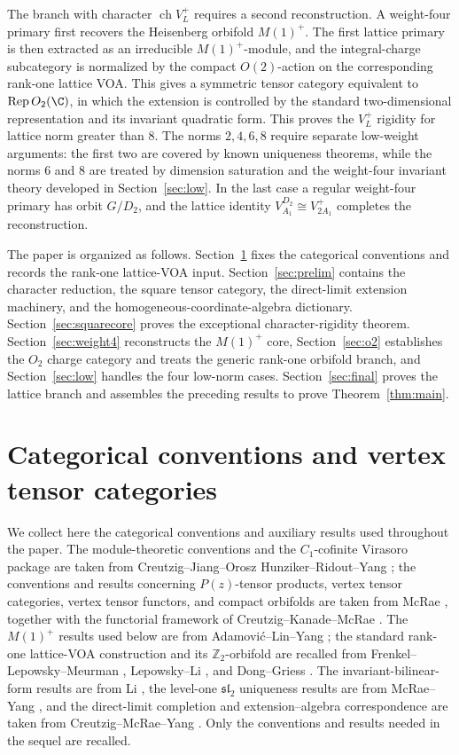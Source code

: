 \documentclass[12pt,leqno]{amsart}
\numberwithin{equation}{section} \newtheorem{thm}{Theorem}[section] \newtheorem{lem}[thm]{Lemma} \newtheorem{ex}[thm]{Example} \newtheorem{prop}[thm]{Proposition} \newtheorem{cor}[thm]{Corollary} \newtheorem{defi}[thm]{Definition} \newtheorem{rmk}[thm]{Remark} \newtheorem{notation}[thm]{Notation}
\newcommand{\Rep}{\operatorname{Rep}}
\newcommand{\ch}{\operatorname{ch}}
\begin{document}
The branch with character $\ch V_L^+$ requires a second reconstruction. A weight-four primary first recovers the Heisenberg orbifold $M(1)^+$. The first lattice primary is then extracted as an irreducible $M(1)^+$-module, and the integral-charge subcategory is normalized by the compact $O(2)$-action on the corresponding rank-one lattice VOA. This gives a symmetric tensor category equivalent to $\Rep O_2(\C)$, in which the extension is controlled by the standard two-dimensional representation and its invariant quadratic form. This proves the $V_L^+$ rigidity for lattice norm greater than $8$. The norms $2,4,6,8$ require separate low-weight arguments: the first two are covered by known uniqueness theorems, while the norms $6$ and $8$ are treated by dimension saturation and the weight-four invariant theory developed in Section~\ref{sec:low}. In the last case a regular weight-four primary has orbit $G/D_2$, and the lattice identity $V_{A_1}^{D_2}\cong V_{2A_1}^+$ completes the reconstruction.

The paper is organized as follows. Section~\ref{sec:categorical} fixes the categorical conventions and records the rank-one lattice-VOA input. Section~\ref{sec:prelim} contains the character reduction, the square tensor category, the direct-limit extension machinery, and the homogeneous-coordinate-algebra dictionary. Section~\ref{sec:squarecore} proves the exceptional character-rigidity theorem. Section~\ref{sec:weight4} reconstructs the $M(1)^+$ core, Section~\ref{sec:o2} establishes the $O_2$ charge category and treats the generic rank-one orbifold branch, and Section~\ref{sec:low} handles the four low-norm cases. Section~\ref{sec:final} proves the lattice branch and assembles the preceding results to prove Theorem~\ref{thm:main}.

\section{Categorical conventions and vertex tensor categories}
\label{sec:categorical}

We collect here the categorical conventions and auxiliary results used throughout the paper. The module-theoretic conventions and the $C_1$-cofinite Virasoro package are taken from Creutzig--Jiang--Orosz Hunziker--Ridout--Yang \cite{CJORY}; the conventions and results concerning $P(z)$-tensor products, vertex tensor categories, vertex tensor functors, and compact orbifolds are taken from McRae \cite{McRae}, together with the functorial framework of Creutzig--Kanade--McRae \cite{CKM}. The $M(1)^+$ results used below are from Adamovi\'c--Lin--Yang \cite{ALY}; the standard rank-one lattice-VOA construction and its $\mathbb Z_2$-orbifold are recalled from Frenkel--Lepowsky--Meurman \cite[Chapter~8]{FLM}, Lepowsky--Li \cite[Sections~6.4--6.5]{LepowskyLi}, and Dong--Griess \cite[Section~2]{DG98}. The invariant-bilinear-form results are from Li \cite{LiInvariant}, the level-one $\mathfrak{sl}_2$ uniqueness results are from McRae--Yang \cite{MY}, and the direct-limit completion and extension--algebra correspondence are taken from Creutzig--McRae--Yang \cite{CMY}. Only the conventions and results needed in the sequel are recalled.
\end{document}
